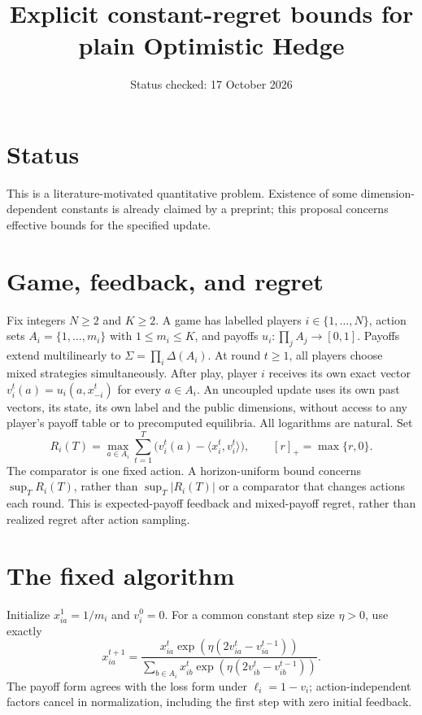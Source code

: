 \documentclass[11pt]{article}
\title{Explicit constant-regret bounds for plain Optimistic Hedge}
\author{}
\date{Status checked: 17 October 2026}
\begin{document}
\maketitle
\section*{Status}
This is a literature-motivated quantitative problem. Existence of some
dimension-dependent constants is already claimed by a preprint; this
proposal concerns effective bounds for the specified update.
\section*{Game, feedback, and regret}
Fix integers $N\geq 2$ and $K\geq 2$. A game has labelled players
$i\in\{1,\ldots,N\}$, action sets $A_i=\{1,\ldots,m_i\}$ with
$1\leq m_i\leq K$, and payoffs $u_i:\prod_j A_j\to[0,1]$.
Payoffs extend multilinearly to $\Sigma=\prod_i\Delta(A_i)$.
At round $t\geq1$, all players choose mixed strategies simultaneously.
After play, player $i$ receives its own exact vector
$v_i^t(a)=u_i(a,x_{-i}^t)$ for every $a\in A_i$.
An uncoupled update uses its own past vectors, its state, its own label and
the public dimensions, without access to any player's payoff table or to
precomputed equilibria. All logarithms are natural. Set
\[
 R_i(T)=\max_{a\in A_i}\sum_{t=1}^T
  \bigl(v_i^t(a)-\langle x_i^t,v_i^t\rangle\bigr),
 \qquad [r]_+=\max\{r,0\}.
\]
The comparator is one fixed action. A horizon-uniform bound concerns
$\sup_T R_i(T)$, rather than $\sup_T|R_i(T)|$ or a comparator that changes
actions each round. This is expected-payoff feedback and mixed-payoff
regret, rather than realized regret after action sampling.

\section*{The fixed algorithm}
Initialize $x_{ia}^1=1/m_i$ and $v_i^0=0$. For a common constant
step size $\eta>0$, use exactly
\[
 x_{ia}^{t+1}=\frac{x_{ia}^{t}\exp(\eta(2v_{ia}^{t}-v_{ia}^{t-1}))}
 {\sum_{b\in A_i}x_{ib}^{t}\exp(\eta(2v_{ib}^{t}-v_{ib}^{t-1}))}.
\]
The payoff form agrees with the loss form under $\ell_i=1-v_i$;
action-independent factors cancel in normalization, including the first
step with zero initial feedback.
\end{document}
